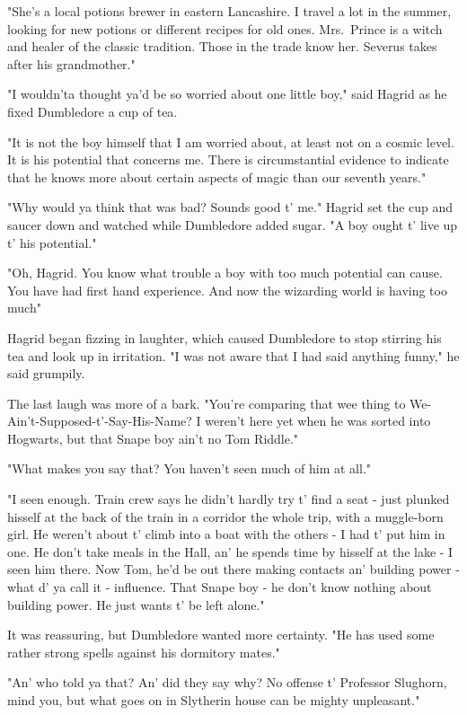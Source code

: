 "She's a local potions brewer in eastern Lancashire. I travel a lot in the summer, looking for new potions or different recipes for old ones. Mrs.~Prince is a witch and healer of the classic tradition. Those in the trade know her. Severus takes after his grandmother."

"I wouldn'ta thought ya'd be so worried about one little boy," said Hagrid as he fixed Dumbledore a cup of tea.

"It is not the boy himself that I am worried about, at least not on a cosmic level. It is his potential that concerns me. There is circumstantial evidence to indicate that he knows more about certain aspects of magic than our seventh years."

"Why would ya think that was bad? Sounds good t' me." Hagrid set the cup and saucer down and watched while Dumbledore added sugar. "A boy ought t' live up t' his potential."

"Oh, Hagrid. You know what trouble a boy with too much potential can cause. You have had first hand experience. And now the wizarding world is having too much{\el}"

Hagrid began fizzing in laughter, which caused Dumbledore to stop stirring his tea and look up in irritation. "I was not aware that I had said anything funny," he said grumpily.

The last laugh was more of a bark. "You're comparing that wee thing to We-Ain't-Supposed-t'-Say-His-Name? I weren't here yet when he was sorted into Hogwarts, but that Snape boy ain't no Tom Riddle."

"What makes you say that? You haven't seen much of him at all."

"I seen enough. Train crew says he didn't hardly try t' find a seat - just plunked hisself at the back of the train in a corridor the whole trip, with a muggle-born girl. He weren't about t' climb into a boat with the others - I had t' put him in one. He don't take meals in the Hall, an' he spends time by hisself at the lake - I seen him there. Now Tom, he'd be out there making contacts an' building power - what d' ya call it - influence. That Snape boy - he don't know nothing about building power. He just wants t' be left alone."

It was reassuring, but Dumbledore wanted more certainty. "He has used some rather strong spells against his dormitory mates."

"An' who told ya that? An' did they say why? No offense t' Professor Slughorn, mind you, but what goes on in Slytherin house can be mighty unpleasant."

